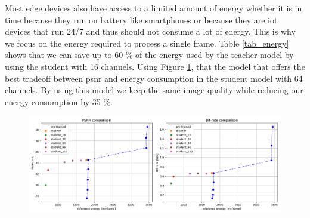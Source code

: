 Most edge devices also have access to a limited amount of energy whether it is in time because they run on battery like smartphones or because they are \acrshort{iot} devices that run 24/7 and thus should not consume a lot of energy. This is why we focus on the energy required to process a single frame. Table \ref{tab_energy} shows that we can save up to 60 \% of the energy used by the teacher model by using the student with 16 channels. Using Figure \ref{kd_lic_energy}, that the model that offers the best tradeoff between \acrshort{psnr} and energy consumption in the student model with 64 channels. By using this model we keep the same image quality while reducing our energy consumption by 35 \%.

\begin{figure}
    \centering
    \includegraphics[width=15cm]{img/kd_lic_energy.png}
    \caption[]{}
    \label{kd_lic_energy}
\end{figure}

